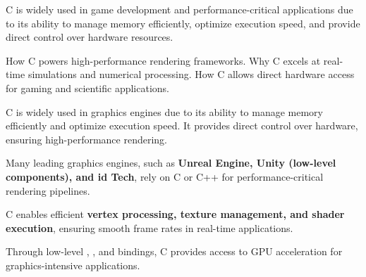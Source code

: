 \begin{NxSSSBox}
	\begin{NxIDBox}
		C is widely used in game development and performance-critical applications due to its ability to manage memory efficiently, optimize execution speed, and provide direct control over hardware resources.
	\end{NxIDBox}
	\begin{NxIDBoxL}
		 How C powers high-performance rendering frameworks.
		 Why C excels at real-time simulations and numerical processing.
		 How C allows direct hardware access for gaming and scientific applications.
	\end{NxIDBoxL}
\end{NxSSSBox}

\begin{NxSSSSBox}
	\begin{NxIDBox}
		C is widely used in graphics engines due to its ability to manage memory efficiently and optimize execution speed. It provides direct control over hardware, ensuring high-performance rendering.
	\end{NxIDBox}
	\begin{NxIDBox}
		Many leading graphics engines, such as \textbf{Unreal Engine, Unity (low-level components), and id Tech}, rely on C or C++ for performance-critical rendering pipelines.
	\end{NxIDBox}
	\begin{NxIDBox}
		C enables efficient \textbf{vertex processing, texture management, and shader execution}, ensuring smooth frame rates in real-time applications.
	\end{NxIDBox}
	\begin{NxIDBox}
		Through low-level , , and  bindings, C provides access to GPU acceleration for graphics-intensive applications.
	\end{NxIDBox}
\end{NxSSSSBox}

